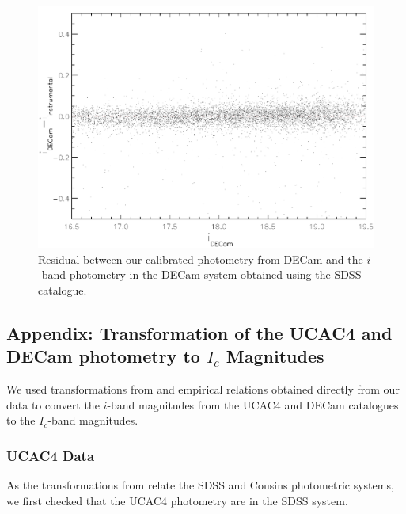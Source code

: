 \documentclass[12pt]{article}
\begin{document}
\begin{figure}
	\begin{minipage}{0.60\textwidth}
		\includegraphics[width=1.00\textwidth]{i_DECam-i_instrumental_vs_i_DECam.pdf}
	\end{minipage} \hfill
	\begin{minipage}{0.35\textwidth}
		\caption[Calibration of the DECam photometry.]{Residual between our calibrated photometry from DECam and the $i$-band photometry in the DECam system obtained using the SDSS catalogue.}
		\label{fig_IMF:DECam_instrumental}
	\end{minipage}
\end{figure}

\subsection{Appendix: Transformation of the UCAC4 and DECam photometry to $I_c$ Magnitudes}
\label{sec_app_IMF:photometry_transformation}

We used transformations from \citet{Jordi2006} and empirical relations obtained directly from our data to convert the $i$-band magnitudes from the UCAC4 and DECam catalogues to the $I_c$-band magnitudes.

\subsubsection{UCAC4 Data}
As the transformations from \citet{Jordi2006} relate the SDSS and Cousins photometric systems, we first checked that the UCAC4 photometry are in the SDSS system.
\end{document}
